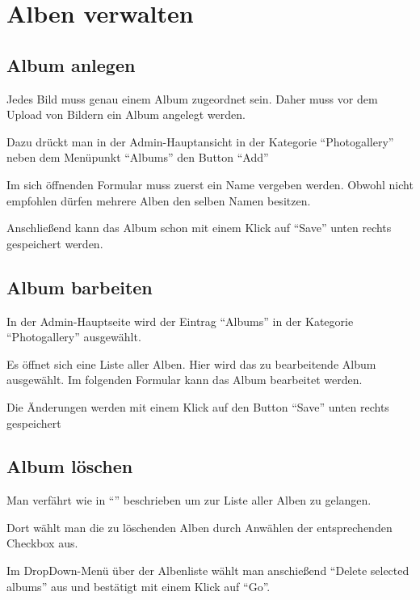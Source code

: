 \section {Alben verwalten}
\subsection{Album anlegen}
Jedes Bild muss genau einem Album zugeordnet sein. Daher muss vor dem Upload von Bildern ein Album angelegt werden.

Dazu drückt man in der Admin-Hauptansicht in der Kategorie \enquote{Photogallery} neben dem Menüpunkt \enquote{Albums} den Button \enquote{Add}

Im sich öffnenden Formular muss zuerst ein Name vergeben werden. Obwohl nicht empfohlen dürfen mehrere Alben den selben Namen besitzen.

Anschließend kann das Album schon mit einem Klick auf \enquote{Save} unten rechts gespeichert werden.
\subsection{Album barbeiten}
\label{subsec:modAlbum}
In der Admin-Hauptseite wird der Eintrag \enquote{Albums} in der Kategorie \enquote{Photogallery} ausgewählt.

Es öffnet sich eine Liste aller Alben. Hier wird das zu bearbeitende Album ausgewählt.
Im folgenden Formular kann das Album bearbeitet werden.

Die Änderungen werden mit einem Klick auf den Button \enquote{Save} unten rechts gespeichert

\subsection{Album löschen}
Man verfährt wie in \enquote{} beschrieben um zur Liste aller Alben zu gelangen. 

Dort wählt man die zu löschenden Alben durch Anwählen der entsprechenden Checkbox aus.

Im DropDown-Menü über der Albenliste wählt man anschießend \enquote{Delete selected albums} aus und bestätigt mit einem Klick auf \enquote{Go}.